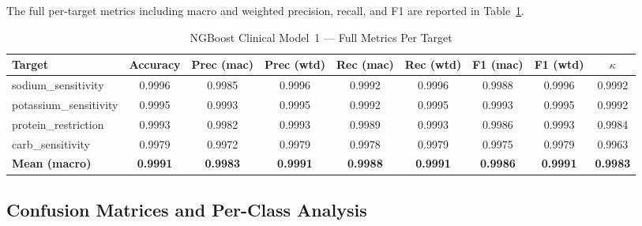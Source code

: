 \documentclass[journal]{IEEEtran}
\begin{document}
The full per-target metrics including macro and weighted precision,
recall, and F1 are reported in Table~\ref{tab:ngboost_full}.

\begin{table}[!t]
\caption{NGBoost Clinical Model~1 --- Full Metrics Per Target}
\label{tab:ngboost_full}
\centering
\renewcommand{\arraystretch}{1.2}
\begin{tabular}{lcccccccc}
\toprule
\textbf{Target} & \textbf{Accuracy} & \textbf{Prec (mac)} & \textbf{Prec (wtd)} & \textbf{Rec (mac)} & \textbf{Rec (wtd)} & \textbf{F1 (mac)} & \textbf{F1 (wtd)} & \textbf{$\kappa$} \\
\midrule
sodium\_sensitivity     & 0.9996 & 0.9985 & 0.9996 & 0.9992 & 0.9996 & 0.9988 & 0.9996 & 0.9992 \\
potassium\_sensitivity  & 0.9995 & 0.9993 & 0.9995 & 0.9992 & 0.9995 & 0.9993 & 0.9995 & 0.9992 \\
protein\_restriction    & 0.9993 & 0.9982 & 0.9993 & 0.9989 & 0.9993 & 0.9986 & 0.9993 & 0.9984 \\
carb\_sensitivity       & 0.9979 & 0.9972 & 0.9979 & 0.9978 & 0.9979 & 0.9975 & 0.9979 & 0.9963 \\
\midrule
\textbf{Mean (macro)} & \textbf{0.9991} & \textbf{0.9983} & \textbf{0.9991} & \textbf{0.9988} & \textbf{0.9991} & \textbf{0.9986} & \textbf{0.9991} & \textbf{0.9983} \\
\bottomrule
\end{tabular}
\end{table}

\subsection{Confusion Matrices and Per-Class Analysis}
\end{document}
